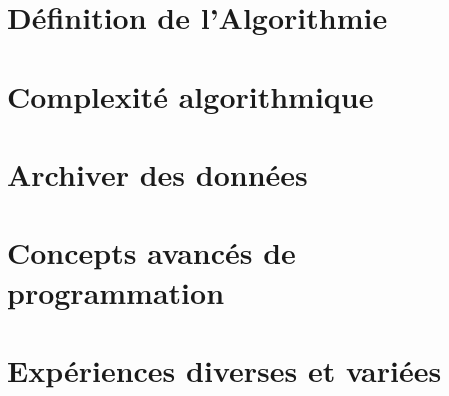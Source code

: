 \documentclass[a4paper,13pt]{report}
\begin{document}
\chapter{Définition de l'Algorithmie}
  
\chapter{Complexité algorithmique}
  
\chapter{Archiver des données}
  
\chapter{Concepts avancés de programmation}
\chapter{Expériences diverses et variées}
\end{document}
